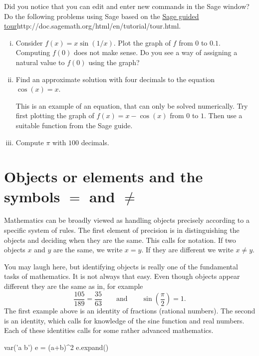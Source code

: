 \documentclass{article}
\begin{document}
\beginshex
Did you notice that you can edit and enter new commands in the Sage window?
Do the following problems using Sage based on the \url{Sage guided tour}{http://doc.sagemath.org/html/en/tutorial/tour.html}. 

\begin{enumerate}[(i)]
\item Consider $f(x) = x \sin(1/x)$. Plot the graph of $f$ from $0$ to $0.1$. Computing $f(0)$ does not make sense. Do you
  see a way of assigning a natural value to $f(0)$ using the graph?
\item Find an approximate solution with four decimals to the equation $\cos(x) = x$.
  
  \begin{hint}[showhide]
    This is an example of an equation, that can only be solved numerically.
    Try first plotting the graph of $f(x) = x - \cos(x)$ from $0$ to $1$. Then use a
    suitable function from the Sage guide.
    \end{hint}
\item Compute $\pi$ with $100$ decimals.
\end{enumerate}
  
\endshex


\section{Objects or elements and the symbols $=$ and $\neq$}

Mathematics can be broadly viewed as handling objects precisely
according to a specific system of rules. The first element
of precision is in distinguishing the objects and deciding when
they are the same. This calls for notation. If two objects
$x$ and $y$ are the same, we write $x = y$. If they are different
we write $x\neq y$.

You may laugh here, but identifying objects is really one of the fundamental tasks of mathematics.
It is not always that easy. Even though objects appear different they are the same as
in, for example
$$
\frac{105}{189} = \frac{35}{63}\qquad\text{and}\qquad \sin\left(\frac{\pi}{2}\right) = 1.
$$
The first example above is an identity of fractions (rational numbers). The second is
an identity, which calls for knowledge of the sine function and real numbers. Each of these
identities calls for some rather advanced mathematics.


\beginshex\label{sagecompex1}

\begin{sage}
var('a b')
e = (a+b)^2
e.expand()
\end{sage}
\end{document}
